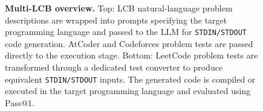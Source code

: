 \documentclass{llmxive}
\providecommand{\figscale}{0.6}
\begin{document}
\begin{figure}[t]
\caption{\textbf{Multi-LCB overview.}  
Top: LCB natural-language problem descriptions are wrapped into prompts specifying the target programming language and passed to the LLM for \texttt{STDIN/STDOUT} code generation.  
AtCoder and Codeforces problem tests are passed directly to the execution stage. 
Bottom: LeetCode problem tests are transformed through a dedicated test converter to produce equivalent \texttt{STDIN/STDOUT} inputs. 
The generated code is compiled or executed in the target programming language and evaluated using Pass@1.}
\label{fig:multi-lcb-overview}
\end{figure}
\end{document}
